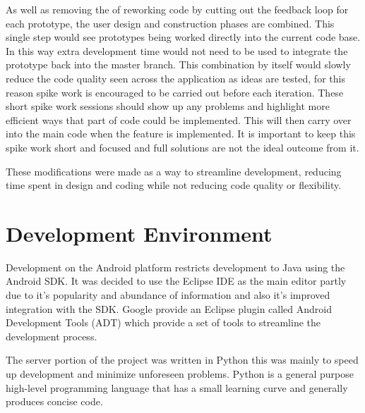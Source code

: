 As well as removing the of reworking code by cutting out the feedback loop for each prototype, the user design and construction phases are combined. This single step would see prototypes being worked directly into the current code base. In this way extra development time would not need to be used to integrate the prototype back into the master branch. This combination by itself would slowly reduce the code quality seen across the application as ideas are tested, for this reason spike work is encouraged to be carried out before each iteration. These short spike work sessions should show up any problems and highlight more efficient ways that part of code could be implemented. This will then carry over into the main code when the feature is implemented. It is important to keep this spike work short and focused and full solutions are not the ideal outcome from it.

These modifications were made as a way to streamline development, reducing time spent in design and coding while not reducing code quality or flexibility.




\section{Development Environment}
Development on the Android platform restricts development to Java using the Android SDK. It was decided to use the Eclipse IDE as the main editor partly due to it's popularity and abundance of information and also it's improved integration with the SDK. Google provide an Eclipse plugin called Android Development Tools (ADT) which provide a set of tools to streamline the development process. 



The server portion of the project was written in Python this was mainly to speed up development and minimize unforeseen problems. Python is a general purpose high-level programming language that has a small learning curve and generally produces concise code.